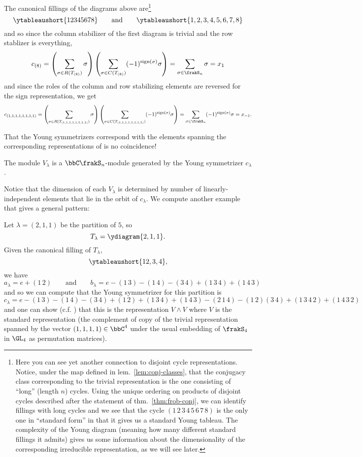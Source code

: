 \documentclass[12pt]{article}
\begin{document}
The canonical fillings of the diagrams above are\footnote{Here you can see yet another connection to disjoint cycle representations. Notice, under the map 
defined in lem.~\ref{lem:conj-classes}, that the conjugacy class corresponding to the trivial representation is the one consisting of ``long'' (length $n$) cycles. Using the 
unique ordering on products of disjoint cycles described after the statement of thm.~\ref{thm:frob-conj}, we can identify fillings with long cycles and we see 
that the cycle $(1\,2\,3\,4\,5\,6\,7\,8)$ is the only one in ``standard form'' in that it gives us a standard Young tableau. The complexity of the Young diagram (meaning how many 
different standard fillings it admits) gives us some information about the dimensionality of the corresponding irreducible representation, as we will see later.}
\[\ytableaushort{12345678}\qquad\text{and}\qquad\ytableaushort{1,2,3,4,5,6,7,8}\]
and so since the column stabilizer of the first diagram is trivial and the row stablizer is everything,
\[c_{(8)}=\left(\sum_{\sigma\in R(T_{(8)})}\sigma\right)\left(\sum_{\sigma\in C(T_{(8)})}(-1)^{\operatorname{sign}(\sigma)}\sigma\right)=\sum_{\sigma\in\frakS_n}\sigma=x_1\]
and since the roles of the column and row stabilizing elements are reversed for the sign representation, we get 
\[c_{(1,1,1,1,1,1,1,1)}=\left(\sum_{\sigma\in R(T_{(1,1,1,1,1,1,1,1)})}\sigma\right)\left(\sum_{\sigma\in C(T_{(1,1,1,1,1,1,1,1)})}(-1)^{\operatorname{sign}(\sigma)}\sigma\right)=\sum_{\sigma\in\frakS_n}(-1)^{\operatorname{sign}(\sigma)}\sigma=x_{-1}.\]

That the Young symmetrizers correspond with the elements spanning the corresponding representations of is no coincidence! 
\begin{defn}
	The module $V_\lambda$ is a $\bbC\frakS_n$-module generated by the Young symmetrizer $c_\lambda$.
\end{defn}
Notice that the dimension of each $V_\lambda$ is determined by number of linearly-independent elements that lie in the orbit of $c_\lambda$. We compute another example that 
gives a general pattern:
\begin{ex}
	Let $\lambda=(2,1,1)$ be the partition of $5$, so 
	\[T_\lambda=\ydiagram{2,1,1}.\]
	Given the canonical filling of $T_\lambda$,
	\[\ytableaushort{12,3,4},\]
	we have 
	\[a_\lambda=e+(1\,2)\qquad\text{and}\qquad b_\lambda=e-(1\,3)-(1\,4)-(3\,4)+(1\,3\,4)+(1\,4\,3)\]
	and so we can compute that the Young symmetrizer for this partition is 
	\[c_\lambda=e-(1\,3)-(1\,4)-(3\,4)+(1\,2)+(1\,3\,4)+(1\,4\,3)-(2\,1\,4)-(1\,2)(3\,4)+(1\,3\,4\,2)+(1\,4\,3\,2)\]
	and one can show (c.f. \cite[48]{fulton-harris}) that this is the representation $V\wedge V$ where $V$ is the standard representation 
	(the complement of copy of the trivial representation spanned by the vector $(1,1,1,1)\in\bbC^4$ under the usual embedding of 
	$\frakS_4$ in $\GL_4$ as permutation matrices).
\end{ex}
\end{document}

